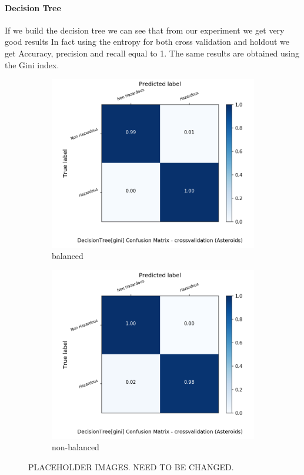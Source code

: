 \documentclass{article}
\begin{document}
\paragraph{Decision Tree}
If we build the decision tree we can see that from our experiment we get very good results
In fact using the entropy for both cross validation and holdout we get Accuracy, precision and recall equal to 1.
The same results are obtained using the Gini index.


\begin{figure}[H]
	\centering
	\begin{subfigure}{.5\textwidth}
		\centering
		\includegraphics[width=1.1\textwidth]{Plots/asteroids/asteroids_DecisionTree_gini_balance_True_crossvalidation.png}
		\caption{balanced}
	\end{subfigure}%
	\begin{subfigure}{.5\textwidth}
		\centering
		\includegraphics[width=1.1\textwidth]{Plots/asteroids/asteroids_DecisionTree_gini_balance_False_crossvalidation.png}
		\caption{non-balanced}
	\end{subfigure}
	\caption{{\color{red} PLACEHOLDER IMAGES. NEED TO BE CHANGED.}}
\end{figure}
\end{document}
